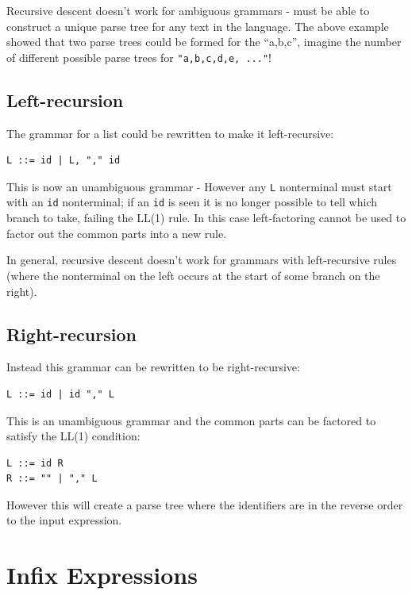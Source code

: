 \documentclass[
]{book}
\begin{document}
Recursive descent doesn't work for ambiguous grammars - must be able to construct a unique parse tree for any text in the language. The above example showed that two parse trees could be formed for the ``a,b,c'', imagine the number of different possible parse trees for \texttt{"a,b,c,d,e,\ ..."}!

\hypertarget{left-recursion}{%
\subsection{Left-recursion}\label{left-recursion}}

The grammar for a list could be rewritten to make it left-recursive:

\begin{verbatim}
L ::= id | L, "," id
\end{verbatim}

This is now an unambiguous grammar - However any \texttt{L} nonterminal must start with an \texttt{id} nonterminal; if an \texttt{id} is seen it is no longer possible to tell which branch to take, failing the LL(1) rule. In this case left-factoring cannot be used to factor out the common parts into a new rule.

{In general, recursive descent doesn't work for grammars with left-recursive rules (where the nonterminal on the left occurs at the start of some branch on the right)}.

\hypertarget{right-recursion}{%
\subsection{Right-recursion}\label{right-recursion}}

Instead this grammar can be rewritten to be right-recursive:

\begin{verbatim}
L ::= id | id "," L
\end{verbatim}

This is an unambiguous grammar and the common parts can be factored to satisfy the LL(1) condition:

\begin{verbatim}
L ::= id R
R ::= "" | "," L
\end{verbatim}

However this will create a parse tree where the identifiers are in the reverse order to the input expression.

\hypertarget{infix-expressions}{%
\section{Infix Expressions}\label{infix-expressions}}
\end{document}
